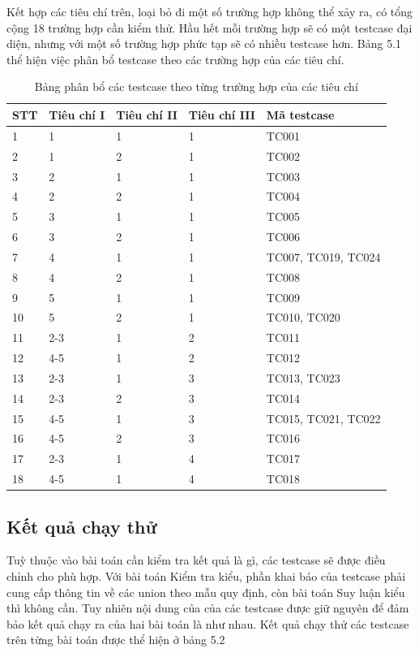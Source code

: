 Kết hợp các tiêu chí trên, loại bỏ đi một số trường hợp không thể xảy ra, có tổng cộng 18 trường hợp cần kiểm thử. Hầu hết mỗi trường hợp sẽ có một testcase đại diện, nhưng với một số trường hợp phức tạp sẽ có nhiều testcase hơn. Bảng 5.1 thể hiện việc phân bổ testcase theo các trường hợp của các tiêu chí.
\begin{table}[h!]
	\centering
	\begin{tabular}{ |p{0.7cm}| p{2cm}| p{2cm}| p{2cm}| p{5cm}|}
		\hline
		
		STT & Tiêu chí I & Tiêu chí II & Tiêu chí III & Mã testcase\\
		\hline
		1 & 1 & 1 & 1 &TC001\\
		\hline
		2 & 1 & 2 & 1 &TC002\\
		\hline
		3 & 2 & 1 & 1 &TC003\\
		\hline
		4 & 2 & 2 & 1 &TC004\\
		\hline
		5 & 3 & 1 & 1 &TC005\\
		\hline
		6 & 3 & 2 & 1 &TC006\\
		\hline
		7 & 4 & 1 & 1 &TC007, TC019, TC024\\
		\hline
		8 & 4 & 2 & 1 &TC008\\
		\hline
		9 & 5 & 1 & 1 &TC009\\
		\hline
		10 & 5 & 2 & 1 &TC010, TC020\\
		\hline
		11 & 2-3& 1 & 2 &TC011\\
		\hline
		12 & 4-5 & 1 & 2 &TC012\\
		\hline
		13 & 2-3 & 1 & 3 &TC013, TC023\\
		\hline
		14 & 2-3 & 2 & 3 &TC014\\
		\hline
		15 & 4-5 & 1 & 3 &TC015, TC021, TC022\\
		\hline
		16 & 4-5 & 2 & 3 &TC016\\
		\hline
		17 & 2-3 & 1 & 4 &TC017\\
		\hline
		18 & 4-5 & 1 & 4 &TC018\\
		\hline
	\end{tabular}
	
	
	\label{table:table2}
	\caption{Bảng phân bổ các testcase theo từng trường hợp của các tiêu chí}
\end{table}
\subsection{Kết quả chạy thử}

Tuỳ thuộc vào bài toán cần kiểm tra kết quả là gì, các testcase sẽ được điều chỉnh cho phù hợp. Với bài toán Kiểm tra kiểu, phần khai báo của testcase phải cung cấp thông tin về các union theo mẫu quy định, còn bài toán Suy luận kiểu thì không cần. Tuy nhiên nội dung của của các testcase được giữ nguyên để đảm bảo kết quả chạy ra của hai bài toán là như nhau. Kết quả chạy thử các testcase trên từng bài toán được thể hiện ở bảng 5.2

